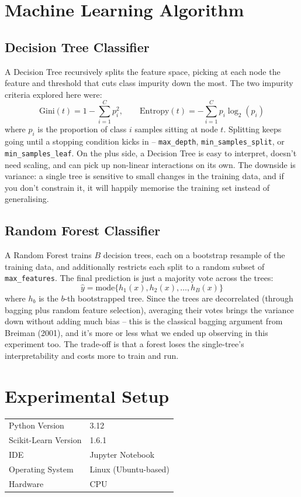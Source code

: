 \documentclass[12pt,a4paper]{article}
\begin{document}
\section{Machine Learning Algorithm}
\subsection*{Decision Tree Classifier}
A Decision Tree recursively splits the feature space, picking at each node the feature and threshold that cuts class impurity down the most. The two impurity criteria explored here were:
\[
\text{Gini}(t) = 1 - \sum_{i=1}^{C} p_i^2, \qquad
\text{Entropy}(t) = -\sum_{i=1}^{C} p_i \log_2(p_i)
\]
where $p_i$ is the proportion of class $i$ samples sitting at node $t$. Splitting keeps going until a stopping condition kicks in -- \texttt{max\_depth}, \texttt{min\_samples\_split}, or \texttt{min\_samples\_leaf}.
On the plus side, a Decision Tree is easy to interpret, doesn't need scaling, and can pick up non-linear interactions on its own. The downside is variance: a single tree is sensitive to small changes in the training data, and if you don't constrain it, it will happily memorise the training set instead of generalising.
 
\subsection*{Random Forest Classifier}
A Random Forest trains $B$ decision trees, each on a bootstrap resample of the training data, and additionally restricts each split to a random subset of \texttt{max\_features}. The final prediction is just a majority vote across the trees:
\[
\hat{y} = \text{mode}\{h_1(x), h_2(x), \dots, h_B(x)\}
\]
where $h_b$ is the $b$-th bootstrapped tree. Since the trees are decorrelated (through bagging plus random feature selection), averaging their votes brings the variance down without adding much bias -- this is the classical bagging argument from Breiman (2001), and it's more or less what we ended up observing in this experiment too. The trade-off is that a forest loses the single-tree's interpretability and costs more to train and run.

\section{Experimental Setup}
\begin{tabular}{ll}
\toprule
Python Version & 3.12 \\
Scikit-Learn Version & 1.6.1 \\
IDE & Jupyter Notebook \\
Operating System & Linux (Ubuntu-based) \\
Hardware & CPU \\
\bottomrule
\end{tabular}
\end{document}

